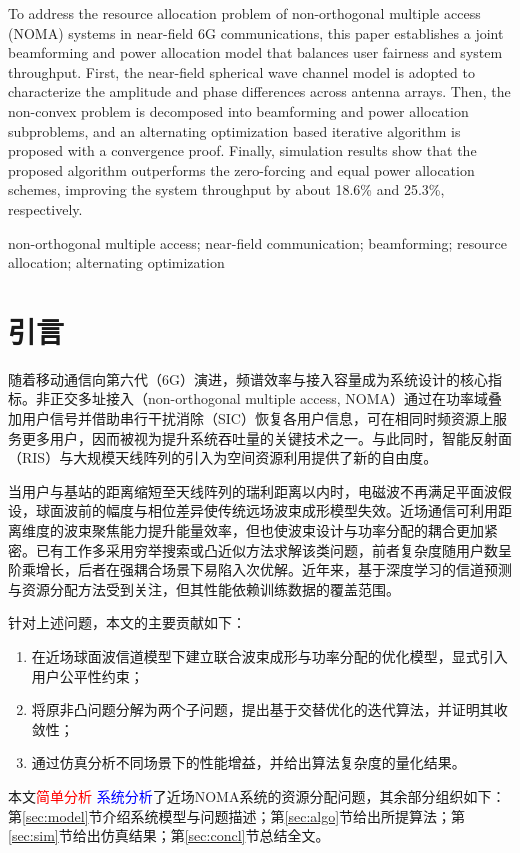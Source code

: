 \documentclass[UTF8, a4paper, zihao=-4, fontset=windows]{ctexart}
\newcommand{\textdelet}[1]{\textcolor{red}{#1}}   %
\newcommand{\textadd}[1]{\textcolor{blue}{#1}}    %
\theoremstyle{plain}
\theoremstyle{definition}
\theoremstyle{plain}
\begin{document}
\begingroup
\sloppy
{}
 To address the resource allocation problem of non-orthogonal multiple access (NOMA) systems in near-field 6G communications, this paper establishes a joint beamforming and power allocation model that balances user fairness and system throughput. First, the near-field spherical wave channel model is adopted to characterize the amplitude and phase differences across antenna arrays. Then, the non-convex problem is decomposed into beamforming and power allocation subproblems, and an alternating optimization based iterative algorithm is proposed with a convergence proof. Finally, simulation results show that the proposed algorithm outperforms the zero-forcing and equal power allocation schemes, improving the system throughput by about 18.6\% and 25.3\%, respectively.
\par\vspace{0.4em}
 non-orthogonal multiple access; near-field communication; beamforming; resource allocation; alternating optimization
\endgroup


\section{引言}

随着移动通信向第六代（6G）演进，频谱效率与接入容量成为系统设计的核心指标。非正交多址接入（non-orthogonal multiple access, NOMA）通过在功率域叠加用户信号并借助串行干扰消除（SIC）恢复各用户信息，可在相同时频资源上服务更多用户，因而被视为提升系统吞吐量的关键技术之一\cite{zhang2020noma}。与此同时，智能反射面（RIS）与大规模天线阵列的引入为空间资源利用提供了新的自由度\cite{liu2021ris,li2020deep,smith2021survey}。

当用户与基站的距离缩短至天线阵列的瑞利距离以内时，电磁波不再满足平面波假设，球面波前的幅度与相位差异使传统远场波束成形模型失效\cite{wang2022near}。近场通信可利用距离维度的波束聚焦能力提升能量效率，但也使波束设计与功率分配的耦合更加紧密\cite{kim2022beam}。已有工作多采用穷举搜索或凸近似方法求解该类问题，前者复杂度随用户数呈阶乘增长\cite{rao2019conf}，后者在强耦合场景下易陷入次优解\cite{chen2019thesis}。近年来，基于深度学习的信道预测与资源分配方法受到关注\cite{sun2022conf}，但其性能依赖训练数据的覆盖范围\cite{zhao2023resource}。

针对上述问题，本文的主要贡献如下：
\begin{enumerate}
  \item 在近场球面波信道模型下建立联合波束成形与功率分配的优化模型，显式引入用户公平性约束；
  \item 将原非凸问题分解为两个子问题，提出基于交替优化的迭代算法，并证明其收敛性；
  \item 通过仿真分析不同场景下的性能增益，并给出算法复杂度的量化结果。
\end{enumerate}
本文\textdelet{简单分析} \textadd{系统分析}了近场NOMA系统的资源分配问题，其余部分组织如下：第\ref{sec:model}节介绍系统模型与问题描述；第\ref{sec:algo}节给出所提算法；第\ref{sec:sim}节给出仿真结果；第\ref{sec:concl}节总结全文。
\end{document}
